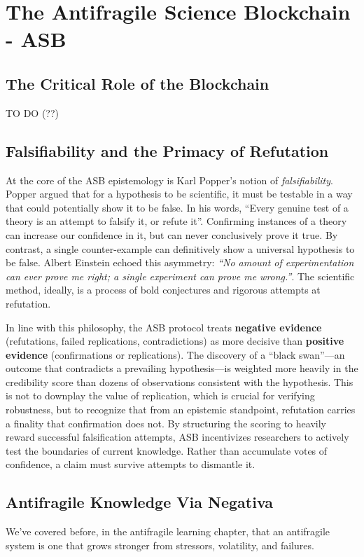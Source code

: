 \documentclass{article}
\begin{document}
\section{The Antifragile Science Blockchain - ASB}

\subsection{The Critical Role of the Blockchain}
TO DO (??)

\subsection{Falsifiability and the Primacy of Refutation}
At the core of the ASB epistemology is Karl Popper's notion of \emph{falsifiability}\cite{Popper1963}. Popper argued that for a hypothesis to be scientific, it must be testable in a way that could potentially show it to be false. In his words, ``Every genuine test of a theory is an attempt to falsify it, or refute it''\cite{Popper1963}. Confirming instances of a theory can increase our confidence in it, but can never conclusively prove it true. By contrast, a single counter-example can definitively show a universal hypothesis to be false. Albert Einstein echoed this asymmetry: \emph{``No amount of experimentation can ever prove me right; a single experiment can prove me wrong.''}. The scientific method, ideally, is a process of bold conjectures and rigorous attempts at refutation.

In line with this philosophy, the ASB protocol treats \textbf{negative evidence} (refutations, failed replications, contradictions) as more decisive than \textbf{positive evidence} (confirmations or replications). The discovery of a ``black swan''---an outcome that contradicts a prevailing hypothesis---is weighted more heavily in the credibility score than dozens of observations consistent with the hypothesis. This is not to downplay the value of replication, which is crucial for verifying robustness, but to recognize that from an epistemic standpoint, refutation carries a finality that confirmation does not. By structuring the scoring to heavily reward successful falsification attempts, ASB incentivizes researchers to actively test the boundaries of current knowledge. Rather than accumulate votes of confidence, a claim must survive attempts to dismantle it.


\subsection{Antifragile Knowledge Via Negativa}
We've covered before, in the antifragile learning chapter, that an antifragile system is one that grows stronger from stressors, volatility, and failures. 
\end{document}
